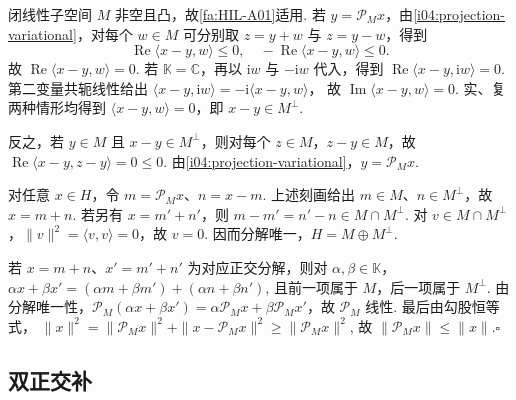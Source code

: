 \begin{FAProof}
闭线性子空间 \(\displaystyle M\) 非空且凸，故\autoref{fa:HIL-A01}适用. 若 \(\displaystyle y=\mathcal P_Mx\)，由\autoref{i04:projection-variational}，对每个 \(\displaystyle w\in M\) 可分别取 \(\displaystyle z=y+w\) 与 \(\displaystyle z=y-w\)，得到
\[
\operatorname{Re}\langle x-y,w\rangle\leqslant0,
\quad
-\operatorname{Re}\langle x-y,w\rangle\leqslant0.
\]
故 \(\displaystyle \operatorname{Re}\langle x-y,w\rangle=0\). 若 \(\displaystyle \mathbb K=\mathbb C\)，再以 \(\displaystyle \mathrm{i}w\) 与 \(\displaystyle -\mathrm{i}w\) 代入，得到 \(\displaystyle \operatorname{Re}\langle x-y,\mathrm{i}w\rangle=0\). 第二变量共轭线性给出 \(\displaystyle \langle x-y,\mathrm{i}w\rangle =-\mathrm{i}\langle x-y,w\rangle\)，
故 \(\displaystyle \operatorname{Im}\langle x-y,w\rangle=0\). 实、复两种情形均得到 \(\displaystyle \langle x-y,w\rangle=0\)，即 \(\displaystyle x-y\in M^\perp\).

反之，若 \(\displaystyle y\in M\) 且 \(\displaystyle x-y\in M^\perp\)，则对每个 \(\displaystyle z\in M\)，\(\displaystyle z-y\in M\)，故 \(\displaystyle \operatorname{Re}\langle x-y,z-y\rangle=0\leqslant0\). 由\autoref{i04:projection-variational}，\(\displaystyle y=\mathcal P_Mx\).

对任意 \(\displaystyle x\in H\)，令 \(\displaystyle m=\mathcal P_Mx\)、\(\displaystyle n=x-m\). 上述刻画给出 \(\displaystyle m\in M\)、\(\displaystyle n\in M^\perp\)，故 \(\displaystyle x=m+n\). 若另有 \(\displaystyle x=m'+n'\)，则 \(\displaystyle m-m'=n'-n\in M\cap M^\perp\). 对 \(\displaystyle v\in M\cap M^\perp\)，\(\displaystyle \|v\|^2=\langle v,v\rangle=0\)，故 \(\displaystyle v=0\). 因而分解唯一，\(\displaystyle H=M\oplus M^\perp\).

若 \(\displaystyle x=m+n\)、\(\displaystyle x'=m'+n'\) 为对应正交分解，则对 \(\displaystyle \alpha,\beta\in\mathbb K\)， \(\displaystyle \alpha x+\beta x'=(\alpha m+\beta m')+(\alpha n+\beta n')\),
且前一项属于 \(\displaystyle M\)，后一项属于 \(\displaystyle M^\perp\). 由分解唯一性，\(\displaystyle \mathcal P_M(\alpha x+\beta x')=\alpha\mathcal P_Mx+\beta\mathcal P_Mx'\)，故 \(\displaystyle \mathcal P_M\) 线性. 最后由勾股恒等式， \(\displaystyle \|x\|^2 =\|\mathcal P_Mx\|^2+\|x-\mathcal P_Mx\|^2 \geqslant\|\mathcal P_Mx\|^2\),
故 \(\displaystyle \|\mathcal P_Mx\|\leqslant\|x\|\).\hfill\(\square\)

\end{FAProof}

\subsection{双正交补}

